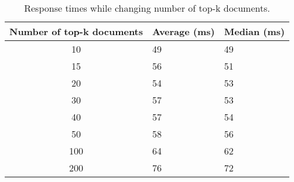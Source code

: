 \begin{table}[h]
    \centering
    \begin{tabular}{|c|l|l|}
    \hline
    \textbf{Number of top-k documents} & \textbf{Average (ms)} & \textbf{Median (ms)} \\ \hline
    10                         & 49           & 49          \\ \hline
    15                         & 56           & 51          \\ \hline
    20                         & 54           & 53          \\ \hline
    30                         & 57           & 53          \\ \hline
    40                         & 57           & 54          \\ \hline
    50                         & 58           & 56          \\ \hline
    100                        & 64           & 62          \\ \hline
    200                        & 76           & 72          \\ \hline
    \end{tabular}
    \caption{Response times while changing number of top-k documents.}
    \label{tbl:query-expansion-topk}
\end{table}
